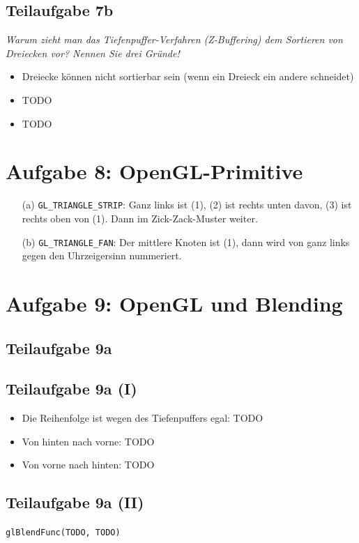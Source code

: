 \documentclass[a4paper]{scrartcl}
\begin{document}
\subsection*{Teilaufgabe 7b}
\textit{Warum zieht man das Tiefenpuffer-Verfahren (Z-Buffering) dem Sortieren von Dreiecken vor? Nennen Sie drei Gründe!}

\begin{itemize}
    \item Dreiecke können nicht sortierbar sein (wenn ein Dreieck ein andere schneidet)
    \item TODO
    \item TODO
\end{itemize}

\section*{Aufgabe 8: OpenGL-Primitive}
\begin{itemize}
    \item[(a)] \texttt{GL\_TRIANGLE\_STRIP}: Ganz links ist (1), (2) ist rechts unten davon, (3) ist rechts oben von (1). Dann im Zick-Zack-Muster weiter.
    \item[(b)] \texttt{GL\_TRIANGLE\_FAN}: Der mittlere Knoten ist (1), dann wird von ganz links gegen den Uhrzeigersinn nummeriert.
\end{itemize}

\section*{Aufgabe 9: OpenGL und Blending}
\subsection*{Teilaufgabe 9a}
\subsection*{Teilaufgabe 9a (I)}
\begin{itemize}
    \item Die Reihenfolge ist wegen des Tiefenpuffers egal: TODO
    \item Von hinten nach vorne: TODO
    \item Von vorne nach hinten: TODO
\end{itemize}

\subsection*{Teilaufgabe 9a (II)}
\texttt{glBlendFunc(TODO, TODO)}
\end{document}
